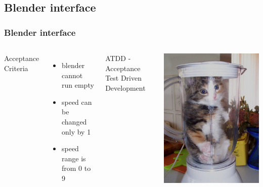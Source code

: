 \documentclass{beamer}
\begin{document}
\subsection{Blender interface}
\begin{frame}
\frametitle{Blender interface}

\begin{columns}
Acceptance Criteria
\begin{itemize}
  \item blender cannot run empty
  \item speed can be changed only by 1
  \item speed range is from 0 to 9 
\end{itemize}
\pause
\begin{block}{}
ATDD - Acceptance Test Driven Development
\end{block}
\includegraphics[scale=0.2]{kitten_in_blender}
\end{columns}
\end{frame}
\end{document}
